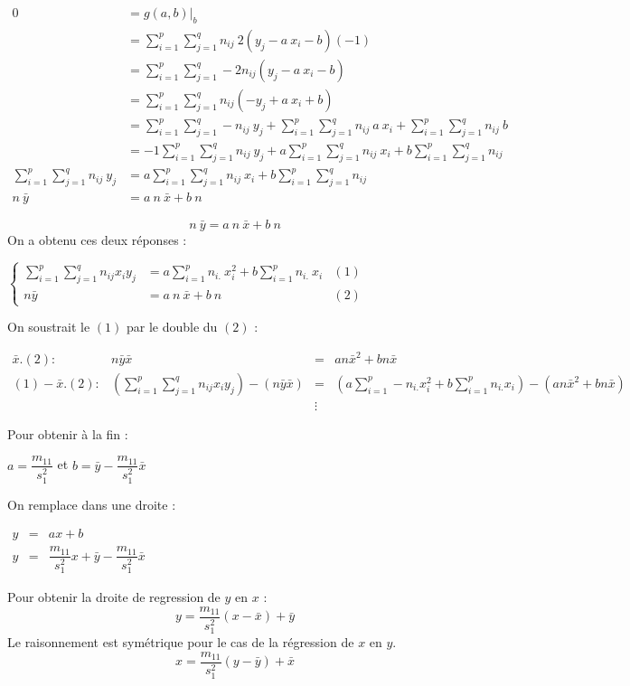 \begin{center}
	$\begin{array}{RL}
		0 &= \left.g(a,b)\right|_b\\
		  &= \sum_{i=1}^{p} \sum_{j=1}^{q} n_{ij}\ 2(y_j - a\ x_i-b)(-1)\\
		  &= \sum_{i=1}^{p} \sum_{j=1}^{q} -2n_{ij}(y_j - a\ x_i - b)\\
		  &= \sum_{i=1}^{p} \sum_{j=1}^{q} n_{ij}(-y_j + a\ x_i + b)\\
		  &= \sum_{i=1}^{p} \sum_{j=1}^{q} -n_{ij}\ y_j + \sum_{i=1}^{p} \sum_{j=1}^{q} n_{ij}\ a\ x_i + \sum_{i=1}^{p} \sum_{j=1}^{q} n_{ij}\ b\\
		  &= -1 \sum_{i=1}^{p} \sum_{j=1}^{q} n_{ij}\ y_j + a \sum_{i=1}^{p} \sum_{j=1}^{q} n_{ij}\ x_i + b \sum_{i=1}^{p} \sum_{j=1}^{q} n_{ij}\\
		\sum_{i=1}^{p} \sum_{j=1}^{q} n_{ij}\ y_j &= a \sum_{i=1}^{p} \sum_{j=1}^{q} n_{ij}\ x_i + b \sum_{i=1}^{p} \sum_{j=1}^{q} n_{ij}\\
		n\ \bar{y} &= a\ n\ \bar{x} + b\ n
	\end{array}$
\end{center}
$$\boxed{n\ \bar{y} = a\ n\ \bar{x} + b\ n}$$
On a obtenu ces deux réponses :
\begin{center}
	$\left\{
	\begin{array}{RLC}
		\sum_{i=1}^{p} \sum_{j=1}^{q}n_{ij}x_iy_j &= a \sum_{i=1}^{p} n_{i.}\ x_i^2 + b \sum_{i=1}^{p} n_{i.}\ x_i &(1)\\
		n\bar{y} &= a\ n\ \bar{x} + b\ n&(2)
	\end{array}
	\right.$
\end{center}
On soustrait le $(1)$ par le double du $(2)$ :
\begin{center}
	$\begin{array}{RRCL}
		\bar{x}.(2) :& n\bar{y}\bar{x} &=& an\bar{x}^2 + bn\bar{x}\\
		(1) - \bar{x}.(2) :& \left(\sum_{i=1}^{p} \sum_{j=1}^{q} n_{ij}x_iy_j \right) - ( n\bar{y}\bar{x} ) &=& \left( a \sum_{i=1}^{p} - n_{i.}x_i^2 + b\sum_{i=1}^{p} n_{i.}x_i \right) - \left( an\bar{x}^2 + bn\bar{x} \right)\\
        &&\vdots&
	\end{array}$
\end{center}
Pour obtenir à la fin :
\begin{center}
	$\boxed{a = \dfrac{m_{11}}{s_1^2}}$ et $\boxed{b = \bar{y} - \dfrac{m_{11}}{s_1^2} \bar{x}} $
\end{center}
On remplace dans une droite :
\begin{center}
	$\begin{array}{RRL}
		y&=&ax+b\\
		y&=&\dfrac{m_{11}}{s_1^2}x+\bar{y} - \dfrac{m_{11}}{s_1^2} \bar{x}
	\end{array}$
\end{center}
Pour obtenir la droite de regression de $y$ en $x$ :
$$\boxed{y = \dfrac{m_{11}}{s_1^2} (x - \bar{x}) + \bar{y}}$$
Le raisonnement est symétrique pour le cas de la régression de $x$ en $y$.
$$\boxed{x = \dfrac{m_{11}}{s_1^2} (y - \bar{y}) + \bar{x}}$$





